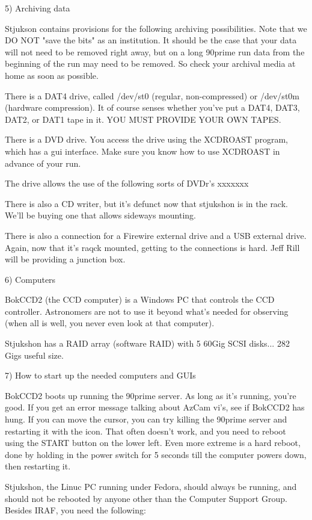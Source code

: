 \documentclass[letterpaper,12pt]{article}
\begin{document}
5) Archiving data

Stjukson contains provisions for the following archiving possibilities.
Note that we DO NOT "save the bits" as an institution. It should
be the case that your data will not need to be removed right away,
but on a long 90prime run data from the beginning of the run may
need to be removed. So check your archival media at home as soon
as possible. 

There is a DAT4 drive, called /dev/st0 (regular, non-compressed)
or /dev/st0m (hardware compression). It of course senses whether
you've put a DAT4, DAT3, DAT2, or DAT1 tape in it. YOU MUST
PROVIDE YOUR OWN TAPES.

There is a DVD drive. You access the drive using the XCDROAST
program, which has a gui interface. Make sure you know how to use
XCDROAST in advance of your run. 

The drive allows the use of the following sorts of DVDr's
xxxxxxx

There is also a CD writer, but it's defunct now that stjukshon
is in the rack. We'll be buying one that allows sideways mounting.

There is also a connection for a Firewire external drive and
a USB external drive. Again, now that it's raqck mounted, getting
to the connections is hard. Jeff Rill will be providing a junction
box. 

6) Computers

BokCCD2 (the CCD computer) is a Windows PC that controls
the CCD controller. Astronomers are not to use it beyond
what's needed for observing (when all is well, you never
even look at that computer).

Stjukshon has a RAID array (software RAID) with 5 60Gig
SCSI disks... 282 Gigs useful size.

7) How to start up the needed computers and GUIs

BokCCD2 boots up running the 90prime server. As long
as it's running, you're good. If you get an error
message talking about AzCam vi's, see if BokCCD2
has hung. If you can move the cursor, you can try killing
the 90prime server and restarting it with the icon.
That often doesn't work, and you need to reboot using the
START button on the lower left. Even more extreme is a hard
reboot, done by holding in the power switch for 5 seconds till
the computer powers down, then restarting it.

Stjukshon, the Linuc PC running under Fedora, should always
be running, and should not be rebooted by anyone other
than the Computer Support Group. Besides IRAF, you need the
following:
\end{document}
